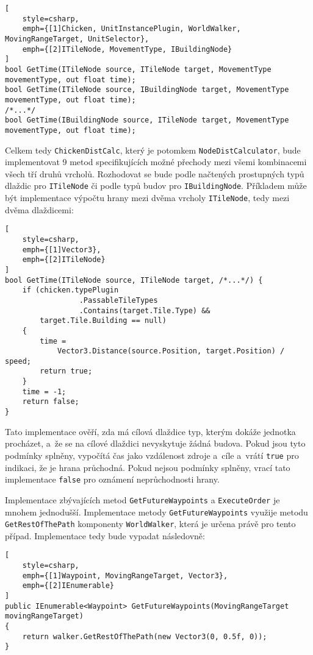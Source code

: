 \begin{lstlisting}[
	style=csharp,
	emph={[1]Chicken, UnitInstancePlugin, WorldWalker, MovingRangeTarget, UnitSelector},
	emph={[2]ITileNode, MovementType, IBuildingNode}
]
bool GetTime(ITileNode source, ITileNode target, MovementType movementType, out float time);
bool GetTime(ITileNode source, IBuildingNode target, MovementType movementType, out float time);
/*...*/
bool GetTime(IBuildingNode source, ITileNode target, MovementType movementType, out float time);
\end{lstlisting}

Celkem tedy \texttt{ChickenDistCalc}, který je potomkem \texttt{NodeDistCalculator}, bude implementovat 9 metod specifikujících možné přechody mezi všemi kombinacemi všech tří druhů vrcholů. Rozhodovat se bude podle načtených prostupných typů dlaždic pro \texttt{ITileNode} či podle typů budov pro \texttt{IBuildingNode}. Příkladem může být implementace výpočtu hrany mezi dvěma vrcholy \texttt{ITileNode}, tedy mezi dvěma dlaždicemi:

\begin{lstlisting}[
	style=csharp,
	emph={[1]Vector3},
	emph={[2]ITileNode}
]
bool GetTime(ITileNode source, ITileNode target, /*...*/) {
	if (chicken.typePlugin
                 .PassableTileTypes
                 .Contains(target.Tile.Type) &&
        target.Tile.Building == null) 
    {
		time = 
			Vector3.Distance(source.Position, target.Position) / speed;
		return true;
	}
	time = -1;
	return false;
}
\end{lstlisting}

Tato implementace ověří, zda má cílová dlaždice typ, kterým dokáže jednotka procházet, a~že se na cílové dlaždici nevyskytuje žádná budova. Pokud jsou tyto podmínky splněny, vypočítá čas jako  vzdálenost zdroje a~cíle a~vrátí \texttt{true} pro indikaci, že je hrana průchodná. Pokud nejsou podmínky splněny, vrací tato implementace \texttt{false} pro oznámení neprůchodnosti hrany.


Implementace zbývajících metod \texttt{GetFutureWaypoints} a \texttt{ExecuteOrder} je mnohem jednodušší. Implementace metody \texttt{GetFutureWaypoints} využije metodu \texttt{GetRestOfThePath} komponenty \texttt{WorldWalker}, která je určena právě pro tento případ. Implementace tedy bude vypadat následovně:

\begin{lstlisting}[
	style=csharp,
	emph={[1]Waypoint, MovingRangeTarget, Vector3},
	emph={[2]IEnumerable}
]
public IEnumerable<Waypoint> GetFutureWaypoints(MovingRangeTarget movingRangeTarget)
{
	return walker.GetRestOfThePath(new Vector3(0, 0.5f, 0));
}
\end{lstlisting}


